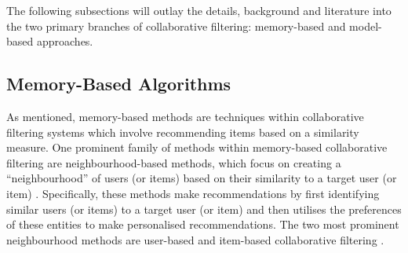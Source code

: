 The following subsections will outlay the details, background and literature into the two primary branches of collaborative filtering: memory-based and model-based approaches.

\subsection{Memory-Based Algorithms}
\label{subsec:2 Memory-Based Algorithms}

As mentioned, memory-based methods are techniques within collaborative filtering systems which involve recommending items based on a similarity measure. One prominent family of methods within memory-based collaborative filtering are neighbourhood-based methods, which focus on creating a “neighbourhood” of users (or items) based on their similarity to a target user (or item) \cite{adamopoulos2013beyond}. Specifically, these methods make recommendations by first identifying similar users (or items) to a target user (or item) and then utilises the preferences of these entities to make personalised recommendations. The two most prominent neighbourhood methods are user-based and item-based collaborative filtering \cite{herlocker2004evaluating}.

